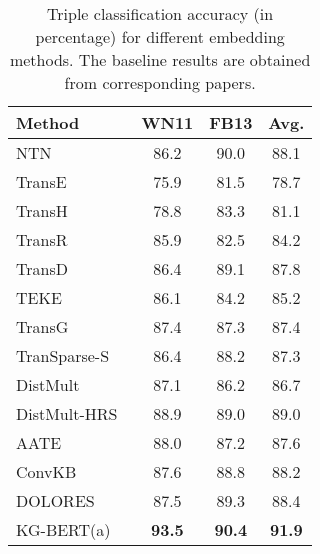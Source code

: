 \documentclass[letterpaper]{article} \usepackage{aaai20}  \usepackage{times}  \usepackage{helvet} \usepackage{courier}  \usepackage[hyphens]{url}  \usepackage{graphicx} \urlstyle{rm} \def\UrlFont{\rm}  \usepackage{graphicx}  \usepackage{amsmath}
\begin{document}
    {\small
    \begin{table}[h]\scriptsize
    \centering
    \renewcommand{\arraystretch}{1.1}

    \begin{tabular}{l|cc|c}
    \hline
    \bf{Method}& WN11& FB13& Avg. \\
    \hline
    NTN~\cite{socher2013reasoning}& 86.2 & 90.0 & 88.1\\
    TransE~\cite{wang2014knowledge} & 75.9 & 81.5 & 78.7 \\   
    TransH~\cite{wang2014knowledge} & 78.8 & 83.3 & 81.1 \\
    TransR~\cite{lin2015learning} & 85.9 & 82.5 & 84.2 \\
    TransD~\cite{ji2015knowledge} & 86.4  & 89.1 & 87.8 \\ 
    TEKE~\cite{wang2016text} & 86.1 & 84.2 & 85.2 \\ 
    TransG~\cite{xiao2016transg} & 87.4  & 87.3  & 87.4  \\
    TranSparse-S~\cite{ji2016knowledge} & 86.4& 88.2& 87.3\\
DistMult~\cite{zhang2018knowledge} & 87.1& 86.2 &86.7 \\
    DistMult-HRS~\cite{zhang2018knowledge} & 88.9& 89.0 &89.0 \\
    AATE~\cite{an2018accurate} & 88.0  & 87.2  & 87.6 \\    
    ConvKB~\cite{SWJ318} & 87.6  & 88.8 & 88.2   \\
    DOLORES~\cite{wang2018dolores} & 87.5 & 89.3  & 88.4   \\
KG-BERT(a) & \textbf{93.5} & \textbf{90.4} & \textbf{91.9} \\
\hline
    \end{tabular}
    \caption{Triple classification accuracy (in percentage) for different embedding methods. The baseline results are obtained from corresponding papers.}
    \label{tab:statistics}
    \end{table}
    }
\end{document}
